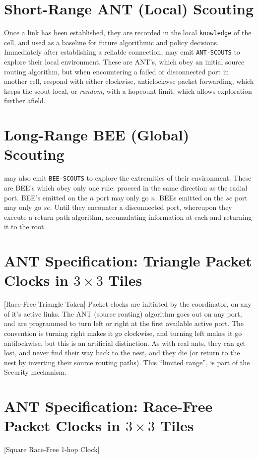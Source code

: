 \documentclass[../../../OAE-SPEC-MAIN.tex]{subfiles}
\begin{document}
\section{Short-Range ANT (Local)  Scouting}
Once a link has been established, they are recorded in the local \texttt{knowledge} of the cell, and used as a baseline for future algorithmic and policy decisions. 
Immediately after establishing a reliable connection, \CELLs may emit \texttt{ANT-SCOUTS} to explore their local environment. These are ANT's, which obey an initial source routing algorithm, but when encountering a failed or disconnected port in another cell, respond with either clockwise, anticlockwse packet forwarding, which keeps the scout local, or \emph{random}, with a hopcount limit, which allows exploration further afield.

\section{Long-Range BEE (Global)  Scouting}
\CELLs may also emit \texttt{BEE-SCOUTS} to explore the extremities of their environment. These are BEE's which obey only one rule: proceed in the same direction as the radial port.   BEE's  emitted on the $n$ port may only go $n$.  BEEs emitted on the $se$ port may only go $se$. Until they encounter a disconnected port, whereupon they execute a return path algorithm, accumulating information at each \CELL and returning it to the root.

\section{ANT Specification: Triangle Packet Clocks in $3 \times 3$ Tiles}
[Race-Free Triangle Token]
Packet clocks are initiated by the coordinator, on any of it's active links.  The ANT (source routing) algorithm goes out on any port, and are programmed to turn left or right at the first available active port.  The convention is turning right makes it go clockwise, and turning left makes it go antilockwise, but this is an artificial distinction. As with real ants, they can get lost, and never find their way back to the nest, and they die (or return to the nest by inverting their source routing paths). This ``limited range'', is part of the Security mechanism. 

\section{ANT Specification: Race-Free Packet Clocks in $3 \times 3$ Tiles}
[Square Race-Free 1-hop Clock]
\end{document}
